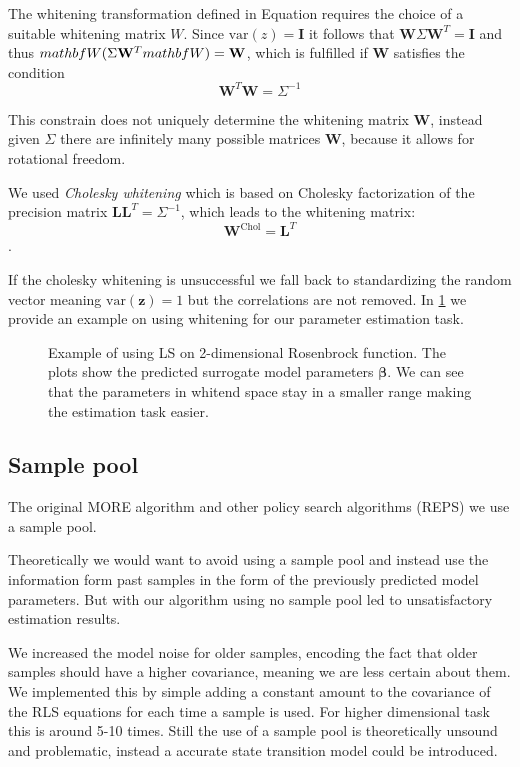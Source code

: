 The whitening transformation defined in Equation  requires
the choice of a suitable whitening matrix $W$.
Since $\text{var}(z) = \mathbf{I}$ it follows that
$\mathbf{W}\Sigma \mathbf{W}^T = \mathbf{I}$ and thus
$\\mathbf{W}(\Sigma \mathbf{W}^T\\mathbf{W}) = \mathbf{W}$, which
is fulfilled if $\mathbf{W}$ satisfies the condition
$$ \mathbf{W}^T \mathbf{W} = \Sigma^{-1} $$

This constrain does not uniquely determine the whitening
matrix $\mathbf{W}$, instead given $\Sigma$ there are infinitely many
possible matrices $\mathbf{W}$, because it allows for rotational freedom.

We used \textit{Cholesky whitening} which is based on
Cholesky factorization of the precision matrix
$\mathbf{L}\mathbf{L}^T = \Sigma^{-1}$, which leads to the whitening
matrix:
$$ \mathbf{W}^{\text{Chol}} = \mathbf{L}^T $$.

If the cholesky whitening is unsuccessful we fall back to standardizing
the random vector meaning $\text{var}(\mathbf{z}) = 1$ but the correlations
are not removed. In \cref{fig:whitening} we provide an example on using
whitening for our parameter estimation task.

\begin{figure}[t]
  \centering
  \caption{Example of using LS on 2-dimensional
   Rosenbrock function. The plots show the predicted surrogate model
   parameters $\mathbf{\beta}$. We can see that
   the parameters in whitend space stay in a smaller range 
   making the estimation task easier.}
 \label{fig:whitening}
\end{figure}
  
\subsection{Sample pool}
The original MORE algorithm and other policy search algorithms (REPS) we
use a sample pool.

Theoretically  we would want to avoid using a sample pool and instead use
the information form past samples in the form of the previously predicted
model parameters. But with our algorithm using no sample pool led
to unsatisfactory estimation results.

We increased the model noise for older samples, encoding the fact that
older samples should have a higher covariance, meaning we are less
certain about them. We implemented this by simple adding a constant
amount to the covariance of the RLS equations for each time a sample is
used. For higher dimensional task this is around 5-10 times.
Still the use of a sample pool is theoretically unsound and problematic,
instead a accurate state transition model could be introduced.

